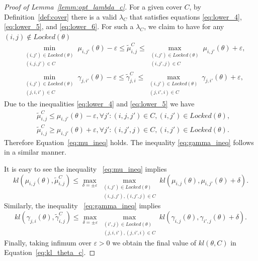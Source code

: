 \documentclass[10pt,a4paper]{amsart}
\begin{document}
\begin{proof}[Proof of Lemma~\ref{lemm:opt_lambda_c}]
For a given cover $C$, by Definition~\ref{def:cover}  there is a valid $\lambda_C$ that satisfies equations \eqref{eq:lower_4}, \eqref{eq:lower_5}, and \eqref{eq:lower_6}. For such a $\lambda_C$, we  claim to have for any $(i,j) \notin Locked(\theta)$
\begin{align}
    & \min_{\substack{(i,j')\in Locked(\theta)\\(i, j, j') \in C}} \mu_{i,j'}(\theta) -\varepsilon \leq \tilde{\mu}^C_{i,j}  \leq   \max_{\substack{(i,j')\in Locked(\theta)\\(i, j', j) \in C}} \mu_{i,j'}(\theta) + \varepsilon,\label{eq:mu_ineq}\\
    &\min_{\substack{(i,j')\in Locked(\theta)\\(j, i, i') \in C}} \gamma_{j,i'}(\theta) -\varepsilon \leq \tilde{\gamma}^C_{j,i} \leq \max_{\substack{(i,j')\in Locked(\theta)\\(j, i', i) \in C}} \gamma_{j,i'}(\theta) + \varepsilon,\label{eq:gamma_ineq}
\end{align}
Due to the inequalities \eqref{eq:lower_4} and \eqref{eq:lower_5} we have 
\begin{align*}
&\tilde{\mu}^C_{i,j} \leq \mu_{i,j'}(\theta) -\varepsilon, \forall j': (i, j, j') \in C, (i,j') \in Locked(\theta), \\
&\tilde{\mu}^C_{i,j} \geq \mu_{i,j'}(\theta) + \varepsilon, \forall j': (i, j', j) \in C,  (i,j') \in Locked(\theta).
\end{align*}
Therefore Equation~\eqref{eq:mu_ineq} holds. The inequality \eqref{eq:gamma_ineq} follows in a similar manner.

It is easy to see  the inequality ~\eqref{eq:mu_ineq} implies 
$$
kl(\mu_{i,j}(\theta), \tilde{\mu}^C_{i,j}) \leq \max_{\delta = \pm\varepsilon}\max_{\substack{(i,j')\in Locked(\theta)\\ (i,j,j'), (i, j', j)\in C}} kl(\mu_{i,j}(\theta), \mu_{i,j'}(\theta) + \delta).
$$
Similarly, the inequality ~\eqref{eq:gamma_ineq} implies
$$
kl(\gamma_{j,i}(\theta), \tilde{\gamma}^C_{i,j}) \leq \max_{\delta = \pm\varepsilon}\max_{\substack{(i',j)\in Locked(\theta)\\(j,i,i'), (j, i', i)\in C}} kl(\gamma_{i,j}(\theta), \gamma_{i',j}(\theta) + \delta).
$$
Finally, taking infimum over $\varepsilon>0$ we obtain the final value of $kl(\theta, C)$ in Equation~\ref{eq:kl_theta_c}.
\end{proof}
\end{document}
